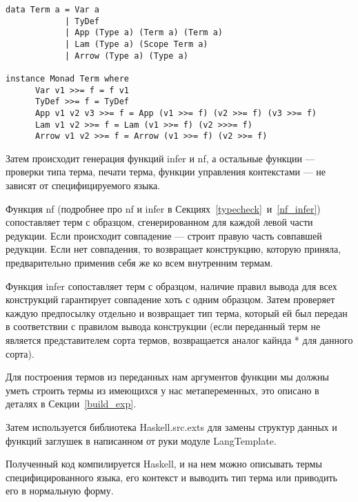 \begin{lstlisting}[caption={Сгенерированное представление АСТ STLC на Haskell и представитель класса Monad},captionpos=b, frame=single, float, floatplacement=H, label={lst_gen_stlc}]
data Term a = Var a
            | TyDef
            | App (Type a) (Term a) (Term a)
            | Lam (Type a) (Scope Term a)
            | Arrow (Type a) (Type a)

instance Monad Term where
      Var v1 >>= f = f v1
      TyDef >>= f = TyDef
      App v1 v2 v3 >>= f = App (v1 >>= f) (v2 >>= f) (v3 >>= f)
      Lam v1 v2 >>= f = Lam (v1 >>= f) (v2 >>>= f)
      Arrow v1 v2 >>= f = Arrow (v1 >>= f) (v2 >>= f)
\end{lstlisting}

Затем происходит генерация функций infer и nf, а остальные функции --- проверки типа терма, печати терма, функции управления контекстами --- не зависят от специфицируемого языка.

\hfill

Функция nf (подробнее про nf и infer в Секциях~\ref{typecheck}~и~\ref{nf_infer}) сопоставляет терм с образцом, сгенерированном для каждой левой части редукции. Если происходит совпадение --- строит правую часть совпавшей редукции. Если нет совпадения, то возвращает конструкцию, которую приняла, предварительно применив себя же ко всем внутренним термам.

Функция infer сопоставляет терм с образцом, наличие правил вывода для всех конструкций гарантирует совпадение хоть с одним образцом. Затем проверяет каждую предпосылку отдельно и возвращает тип терма, который ей был передан в соответствии с правилом вывода конструкции (если переданный терм не является представителем сорта термов, возвращается аналог кайнда * для данного сорта).

Для построения термов из переданных нам аргументов функции мы должны уметь строить термы из имеющихся у нас метапеременных, это описано в деталях в Секции~\ref{build_exp}.

Затем используется библиотека Haskell.src.exts\cite{src_exts} для замены структур данных и функций заглушек в написанном от руки модуле LangTemplate.

Полученный код компилируется Haskell, и на нем можно описывать термы специфицированного языка, его контекст и выводить тип терма или приводить его в нормальную форму.










